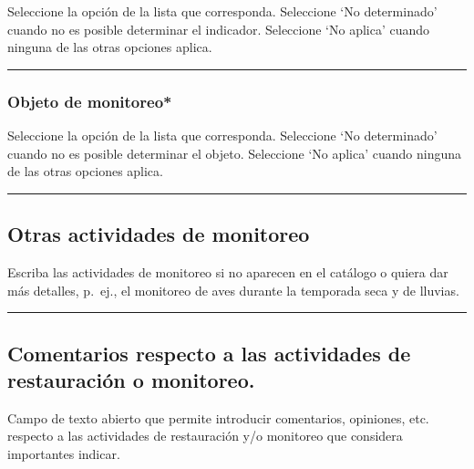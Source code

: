 \documentclass[
]{book}
\begin{document}
Seleccione la opción de la lista que corresponda.
Seleccione `No determinado' cuando no es posible determinar el indicador.
Seleccione `No aplica' cuando ninguna de las otras opciones aplica.

\begin{center}\rule{0.5\linewidth}{0.5pt}\end{center}

\hypertarget{objeto-de-monitoreo}{%
\subsubsection*{\texorpdfstring{{Objeto de monitoreo*}}{Objeto de monitoreo*}}\label{objeto-de-monitoreo}}

Seleccione la opción de la lista que corresponda.
Seleccione `No determinado' cuando no es posible determinar el objeto.
Seleccione `No aplica' cuando ninguna de las otras opciones aplica.

\begin{center}\rule{0.5\linewidth}{0.5pt}\end{center}

\hypertarget{otras-actividades-de-monitoreo}{%
\subsection*{Otras actividades de monitoreo}\label{otras-actividades-de-monitoreo}}

Escriba las actividades de monitoreo si no aparecen en el catálogo o quiera dar más detalles, p.~ej., el monitoreo de aves durante la temporada seca y de lluvias.

\begin{center}\rule{0.5\linewidth}{0.5pt}\end{center}

\hypertarget{comentarios-respecto-a-las-actividades-de-restauraciuxf3n-o-monitoreo.}{%
\subsection*{Comentarios respecto a las actividades de restauración o monitoreo.}\label{comentarios-respecto-a-las-actividades-de-restauraciuxf3n-o-monitoreo.}}

Campo de texto abierto que permite introducir comentarios, opiniones, etc. respecto a las actividades de restauración y/o monitoreo que considera importantes indicar.
\end{document}
